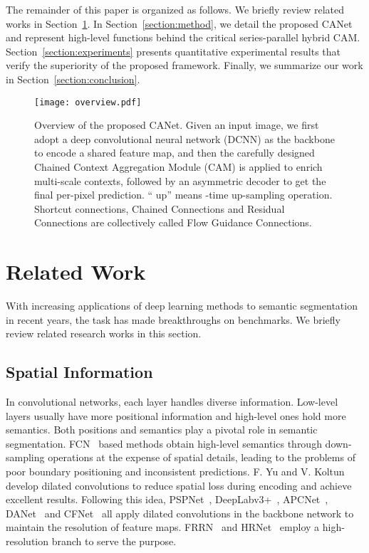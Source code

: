 \documentclass[journal]{IEEEtran}
\begin{document}
The remainder of this paper is organized as follows. We briefly review related works in Section~\ref{section:related_work}. In Section~\ref{section:method}, we detail the proposed CANet and represent high-level functions behind the critical series-parallel hybrid CAM. Section~\ref{section:experiments} presents quantitative experimental results that verify the superiority of the proposed framework. Finally, we summarize our work in Section~\ref{section:conclusion}.

\begin{figure*}
\begin{center}
\texttt{[image: overview.pdf]}
\end{center}
\caption{Overview of the proposed CANet. Given an input image, we first adopt a deep convolutional neural network (DCNN) as the backbone to encode a shared feature map, and then the carefully designed Chained Context Aggregation Module (CAM) is applied to enrich multi-scale contexts, followed by an asymmetric decoder to get the final per-pixel prediction. `` up'' means -time up-sampling operation. Shortcut connections, Chained Connections and Residual Connections are collectively called Flow Guidance Connections.}
\label{fig:overview}
\end{figure*}

\section{Related Work}
\label{section:related_work}
With increasing applications of deep learning methods to semantic segmentation in recent years, the task has made breakthroughs on benchmarks. We briefly review related research works in this section.

\subsection{Spatial Information}
In convolutional networks, each layer handles diverse information. Low-level layers usually have more positional information and high-level ones hold more semantics. Both positions and semantics play a pivotal role in semantic segmentation. FCN~\cite{long2015fully} based methods obtain high-level semantics through down-sampling operations at the expense of spatial details, leading to the problems of poor boundary positioning and inconsistent predictions. F. Yu and V. Koltun~\cite{yu2015multi} develop dilated convolutions to reduce spatial loss during encoding and achieve excellent results. Following this idea, PSPNet~\cite{zhao2017pyramid}, DeepLabv3+~\cite{chen2018encoder}, APCNet~\cite{he2019adaptive}, DANet~\cite{fu2019dual} and CFNet~\cite{zhang2019co} all apply dilated convolutions in the backbone network to maintain the resolution of feature maps. FRRN~\cite{pohlen2017full} and HRNet~\cite{sun2019deep} employ a high-resolution branch to serve the purpose.
\end{document}
